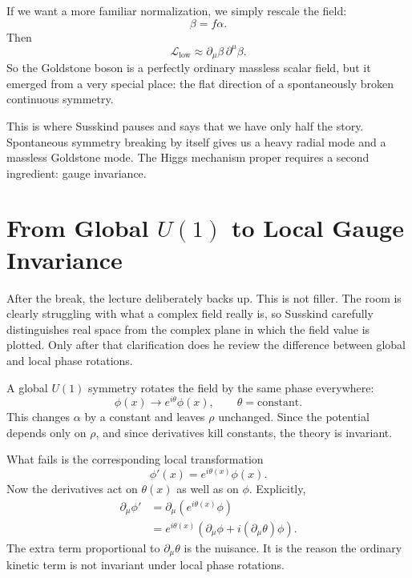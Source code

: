 If we want a more familiar normalization, we simply rescale the field:
\begin{equation}
\beta = f\alpha.
\end{equation}
Then
\begin{equation}
\mathcal L_{\text{low}} \approx \partial_\mu\beta\,\partial^\mu\beta.
\end{equation}
So the Goldstone boson is a perfectly ordinary massless scalar field, but it emerged from a very special place: the flat direction of a spontaneously broken continuous symmetry.

This is where Susskind pauses and says that we have only half the story. Spontaneous symmetry breaking by itself gives us a heavy radial mode and a massless Goldstone mode. The Higgs mechanism proper requires a second ingredient: gauge invariance.

\section{From Global \(U(1)\) to Local Gauge Invariance}

After the break, the lecture deliberately backs up. This is not filler. The room is clearly struggling with what a complex field really is, so Susskind carefully distinguishes real space from the complex plane in which the field value is plotted. Only after that clarification does he review the difference between global and local phase rotations.

A global \(U(1)\) symmetry rotates the field by the same phase everywhere:
\begin{equation}
\phi(x)\to e^{i\theta}\phi(x),
\qquad
\theta=\text{constant}.
\end{equation}
This changes \(\alpha\) by a constant and leaves \(\rho\) unchanged. Since the potential depends only on \(\rho\), and since derivatives kill constants, the theory is invariant.

What fails is the corresponding local transformation
\begin{equation}
\phi'(x)=e^{i\theta(x)}\phi(x).
\end{equation}
Now the derivatives act on \(\theta(x)\) as well as on \(\phi\). Explicitly,
\begin{align}
\partial_\mu \phi'
&=
\partial_\mu\!\left(e^{i\theta(x)}\phi\right) \\
&=
e^{i\theta(x)}
\left(
\partial_\mu\phi + i(\partial_\mu\theta)\phi
\right).
\end{align}
The extra term proportional to \(\partial_\mu\theta\) is the nuisance. It is the reason the ordinary kinetic term is not invariant under local phase rotations.


